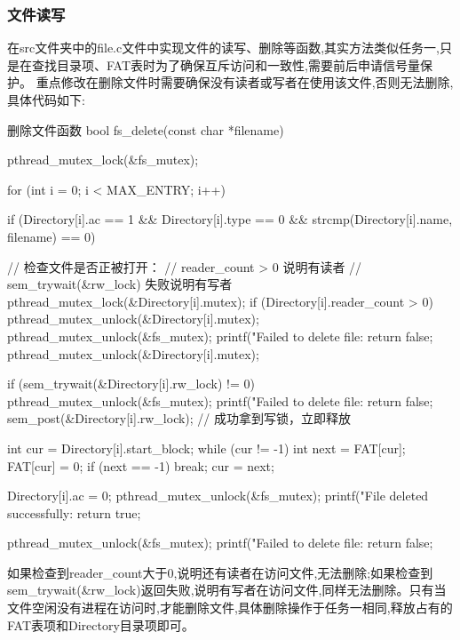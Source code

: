 \subsubsection{文件读写}
在src文件夹中的file.c文件中实现文件的读写、删除等函数,其实方法类似任务一,只是在查找目录项、FAT表时为了确保互斥访问和一致性,需要前后申请信号量保护。
重点修改在删除文件时需要确保没有读者或写者在使用该文件,否则无法删除,具体代码如下:
\begin{ccode}{删除文件函数}
bool fs_delete(const char *filename)
{
    pthread_mutex_lock(&fs_mutex);

    for (int i = 0; i < MAX_ENTRY; i++) {
        if (Directory[i].ac == 1 &&
            Directory[i].type == 0 &&
            strcmp(Directory[i].name, filename) == 0) {

            // 检查文件是否正被打开：
            //  reader_count > 0 说明有读者
            //  sem_trywait(&rw_lock) 失败说明有写者
            pthread_mutex_lock(&Directory[i].mutex);
            if (Directory[i].reader_count > 0) {
                pthread_mutex_unlock(&Directory[i].mutex);
                pthread_mutex_unlock(&fs_mutex);
                printf("Failed to delete file: %
                return false;
            }
            pthread_mutex_unlock(&Directory[i].mutex);

            if (sem_trywait(&Directory[i].rw_lock) != 0) {
                pthread_mutex_unlock(&fs_mutex);
                printf("Failed to delete file: %
                return false;
            }
            sem_post(&Directory[i].rw_lock);  // 成功拿到写锁，立即释放 

            int cur = Directory[i].start_block;
            while (cur != -1) {
                int next = FAT[cur];
                FAT[cur] = 0;
                if (next == -1) break;
                cur = next;
            }

            Directory[i].ac = 0;
            pthread_mutex_unlock(&fs_mutex);
            printf("File deleted successfully: %
            return true;
        }
    }

    pthread_mutex_unlock(&fs_mutex);
    printf("Failed to delete file: %
    return false;
}
\end{ccode}
如果检查到reader\_count大于0,说明还有读者在访问文件,无法删除;如果检查到sem\_trywait(\&rw\_lock)返回失败,说明有写者在访问文件,同样无法删除。只有当文件空闲没有进程在访问时,才能删除文件,具体删除操作于任务一相同,释放占有的FAT表项和Directory目录项即可。